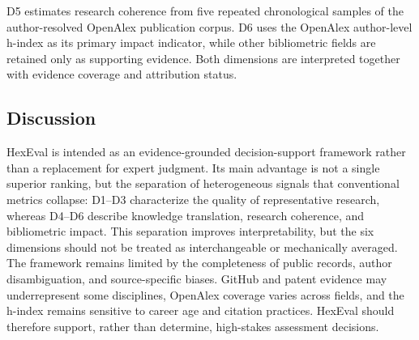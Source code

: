 \documentclass[letterpaper]{article} %
\begin{document}
D5 estimates research coherence from five repeated chronological samples of the author-resolved OpenAlex publication corpus. D6 uses the OpenAlex author-level h-index as its primary impact indicator, while other
bibliometric fields are retained only as supporting evidence. Both dimensions are interpreted together with evidence coverage and attribution status.

\subsection{Discussion}

HexEval is intended as an evidence-grounded decision-support framework rather than a replacement for expert judgment. Its main advantage is not a single superior ranking, but the separation of heterogeneous signals that conventional metrics collapse: D1--D3 characterize the quality of representative research, whereas D4--D6 describe knowledge translation, research coherence, and bibliometric impact. This separation improves interpretability, but the six dimensions should not be treated as interchangeable or mechanically averaged.
The framework remains limited by the completeness of public records, author disambiguation, and source-specific biases. GitHub and patent evidence may underrepresent some disciplines, OpenAlex coverage varies across fields, and the h-index remains sensitive to career age and citation practices. HexEval should therefore support, rather than determine, high-stakes assessment decisions.





% 
\end{document}
